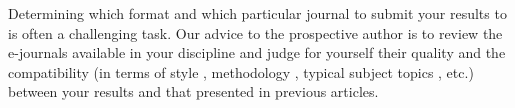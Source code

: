 \documentclass{beamer}
\begin{document}
   \begin{frame}
   Determining which format and which particular journal to submit your results to is often a challenging task. Our advice to the prospective author is to review the e-journals available in your discipline and judge for yourself their quality and the compatibility (in terms of style , methodology , typical subject topics , etc.) between your results and that presented in previous articles.

  \end{frame}
 
 

 
 
\end{document}
